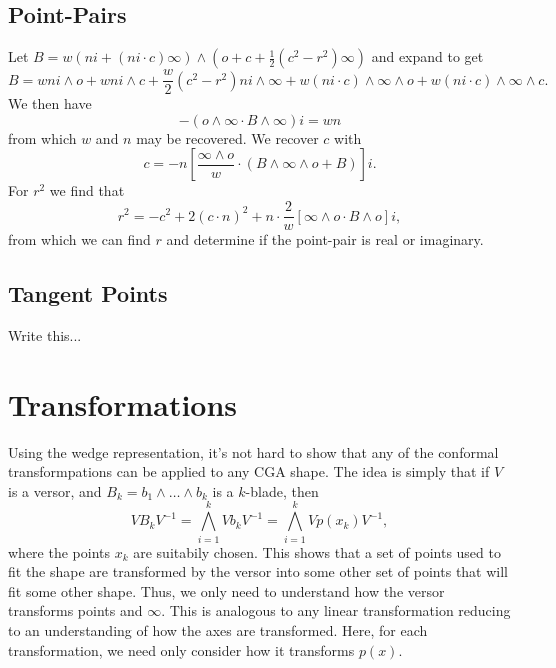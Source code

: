 \documentclass[12pt]{article}
\newcommand{\nvao}{o}
\newcommand{\nvai}{\infty}
\begin{document}
\subsection*{Point-Pairs}

Let $B=w(ni + (ni\cdot c)\nvai)\wedge\left(\nvao + c + \frac{1}{2}(c^2-r^2)\nvai\right)$ and expand
to get
\begin{equation*}
B = wni\wedge\nvao + wni\wedge c + \frac{w}{2}(c^2-r^2)ni\wedge\nvai + w(ni\cdot c)\wedge\nvai\wedge\nvao + w(ni\cdot c)\wedge\nvai\wedge c.
\end{equation*}
We then have
\begin{equation*}
-\left(\nvao\wedge\nvai\cdot B\wedge\nvai\right)i = wn
\end{equation*}
from which $w$ and $n$ may be recovered.  We recover $c$ with
\begin{equation*}
c = -n\left[\frac{\nvai\wedge\nvao}{w}\cdot\left(B\wedge\nvai\wedge\nvao + B\right)\right]i.
\end{equation*}
For $r^2$ we find that
\begin{equation*}
r^2 = -c^2 + 2(c\cdot n)^2 + n\cdot\frac{2}{w}\left[\nvai\wedge\nvao\cdot B\wedge o\right]i,
\end{equation*}
from which we can find $r$ and determine if the point-pair is real or imaginary.

\subsection*{Tangent Points}

Write this...

\section*{Transformations}

Using the wedge representation, it's not hard to show that any of the conformal
transformpations can be applied to any CGA shape.  The idea is simply that if $V$ is a versor,
and $B_k=b_1\wedge\dots\wedge b_k$ is a $k$-blade, then
\begin{equation*}
VB_kV^{-1} = \bigwedge_{i=1}^k Vb_kV^{-1} = \bigwedge_{i=1}^k Vp(x_k)V^{-1},
\end{equation*}
where the points $x_k$ are suitabily chosen.
This shows that a set of points used to fit the shape are transformed by the versor into some other
set of points that will fit some other shape.  Thus,
we only need to understand how the versor transforms points and $\nvai$.
This is analogous to any linear transformation reducing to an understanding of
how the axes are transformed.  Here, for each transformation, we need only consider how
it transforms $p(x)$.
\end{document}
